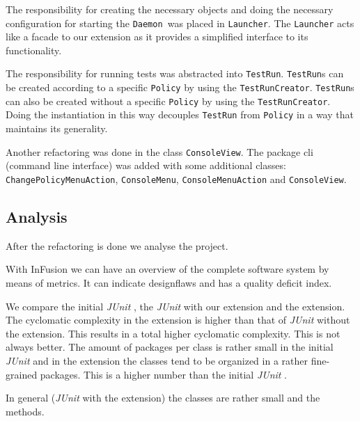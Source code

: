 \documentclass[i3]{oss}
\newcommand{\class}[1]{\texttt{#1}}
\newcommand{\junit}{\emph{JUnit }}
\newcommand{\Daemon}{\class{Daemon  }}
\begin{document}
The responsibility for creating the necessary objects and doing the necessary configuration for starting the \Daemon was placed in \class{Launcher}. 
The \class{Launcher} acts like a facade to our extension as it provides a simplified interface to its functionality.

The responsibility for running tests was abstracted into \class{TestRun}.
\class{TestRun}s can be created according to a specific \class{Policy} by using the \class{TestRunCreator}. \class{TestRun}s can also be created without a specific \class{Policy} by using the \class{TestRunCreator}.
Doing the instantiation in this way decouples \class{TestRun} from \class{Policy} in a way that maintains its generality. 

Another refactoring was done in the class \class{ConsoleView}. The package cli (command line interface) was added with some additional classes: \class{ChangePolicyMenuAction}, \class{ConsoleMenu}, \class{ConsoleMenuAction} and \class{ConsoleView}. 




\subsection{Analysis}
\label{ss:analyse}

After the refactoring is done we analyse the project.

With InFusion we can have an overview of the complete software system by means of metrics. It can indicate designflaws and has a quality deficit index. 

We compare the initial \junit, the \junit with our extension and the extension.  
The cyclomatic complexity in the extension is higher than that of \junit without the extension. This results in a total higher cyclomatic complexity. This is not always better.
The amount of packages per class is rather small in the initial \junit and in the extension the classes tend to be organized in a rather fine-grained packages. This is a higher number than the initial \junit.

In general (\junit with the extension) the classes are rather small and the methods. 
\end{document}
